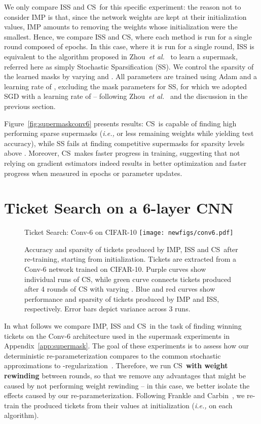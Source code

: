\documentclass{article}
\newcommand{\citet}[1]{\cite{#1}}
\newcommand{\ie}{\textit{i.e.,} }
\newcommand{\etal}{\textit{et al.}}
\newcommand{\methodacro}{CS}
\begin{document}
We only compare ISS and \methodacro~for this specific experiment: the reason not to consider IMP is that, since the network weights are kept at their initialization values, IMP amounts to removing the weights whose initialization were the smallest. Hence, we compare ISS and \methodacro, where each method is run for a single round composed of  epochs. In this case, where it is run for a single round, ISS is equivalent to the algorithm proposed in Zhou~\etal~\citet{deconstructing} to learn a supermask, referred here as simply Stochastic Sparsification (SS). We control the sparsity of the learned masks by varying  and . All parameters are trained using Adam and a learning rate of , excluding the mask parameters  for SS, for which we adopted SGD with a learning rate of  -- following Zhou~\etal~\cite{deconstructing} and the discussion in the previous section.

Figure~\ref{fig:supermaskconv6} presents results: \methodacro~is capable of finding high performing sparse supermasks (\ie  or less remaining weights while yielding  test accuracy), while SS fails at finding competitive supermasks for sparsity levels above . Moreover, \methodacro~makes faster progress in training, suggesting that not relying on gradient estimators indeed results in better optimization and faster progress when measured in epochs or parameter updates.

\section{Ticket Search on a 6-layer CNN}
\label{app:ticket6cnn}

\begin{figure}[t]
    \centering
    \footnotesize{\textsf{Ticket Search: Conv-6 on CIFAR-10}}
    \texttt{[image: newfigs/conv6.pdf]}
    \caption{Accuracy and sparsity of tickets produced by IMP, ISS and \methodacro~after re-training, starting from initialization. Tickets are extracted from a Conv-6 network trained on CIFAR-10. Purple curves show individual runs of \methodacro, while green curve connects tickets produced after 4 rounds of CS with varying . Blue and red curves show performance and sparsity of tickets produced by IMP and ISS, respectively. Error bars depict variance across 3 runs.}
    \label{fig:conv6}
\end{figure}

In what follows we compare IMP, ISS and \methodacro~in the task of finding winning tickets on the Conv-6 architecture used in the supermask experiments in Appendix~\ref{app:supermask}. The goal of these experiments is to assess how our deterministic re-parameterization compares to the common stochastic approximations to -regularization~\cite{l0bernoulli, sparsityl0, deconstructing}. Therefore, we run \methodacro~\textbf{with weight rewinding} between rounds, so that we remove any advantages that might be caused by not performing weight rewinding -- in this case, we better isolate the effects caused by our re-parameterization. Following Frankle and Carbin~\cite{lth}, we re-train the produced tickets from their values at initialization (\ie  on each algorithm).
\end{document}
